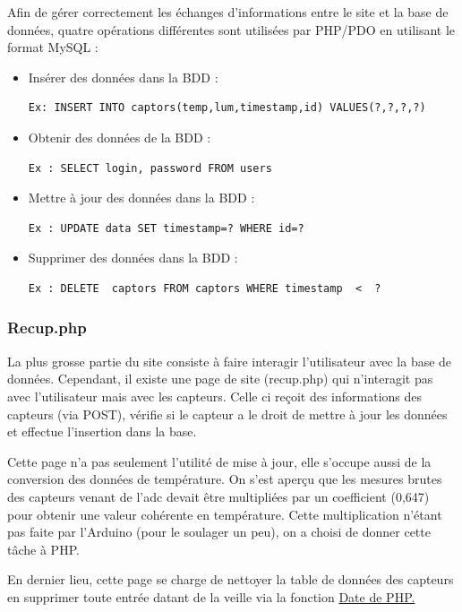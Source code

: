 	\par
	Afin de gérer correctement les échanges d'informations entre le site et la base de données, quatre opérations différentes sont utilisées par PHP/PDO en utilisant le format MySQL :
	\\%
	\begin{itemize}
	\item Insérer des données dans la BDD : 
	\lstset{language=SQL} 
	\begin{lstlisting}[frame=single]
 Ex: INSERT INTO captors(temp,lum,timestamp,id) VALUES(?,?,?,?)
	\end{lstlisting}
	\item Obtenir des données de la BDD : 
	\lstset{language=SQL} 
	\begin{lstlisting}[frame=single]
Ex : SELECT login, password FROM users
	\end{lstlisting}
	\item Mettre à jour des données dans la BDD : 
	\lstset{language=SQL} 
	\begin{lstlisting}[frame=single]
Ex : UPDATE data SET timestamp=? WHERE id=?
	\end{lstlisting}
	\item Supprimer des données dans la BDD : 
	\begin{lstlisting}[frame=single]
Ex : DELETE  captors FROM captors WHERE timestamp  <  ?
	\end{lstlisting}
	\end{itemize}
	\subsubsection{Recup.php}
	\par
	La plus grosse partie du site consiste à faire interagir l'utilisateur avec la base de données. Cependant, il existe une page de site (recup.php) qui n'interagit pas avec l'utilisateur mais avec les capteurs. Celle ci reçoit des informations des capteurs (via POST), vérifie si le capteur a le droit de mettre à jour les données et effectue l'insertion dans la base.
	\par
	Cette page n'a pas seulement l'utilité de mise à jour, elle s'occupe aussi de la conversion des données de température. On s'est aperçu que les mesures brutes des capteurs venant de l'adc devait être multipliées par un coefficient (0,647) pour obtenir une valeur cohérente en température. Cette multiplication n'étant pas faite par l'Arduino (pour le soulager un peu), on a choisi  de donner cette tâche à PHP.
	\par
	En dernier lieu, cette page se charge de nettoyer la table de données des capteurs en supprimer toute entrée datant de la veille via la fonction \href{http://www.php.net/manual/fr/function.date.php}{Date de PHP.}
